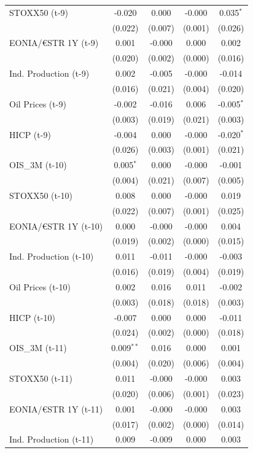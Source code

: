 \begin{longtable}[t]{lcccc}
STOXX50 (t-9) & -0.020 & 0.000 & -0.000 & 0.035$^{*}$\\
 & (0.022) & (0.007) & (0.001) & (0.026)\\
EONIA/€STR 1Y (t-9) & 0.001 & -0.000 & 0.000 & 0.002\\
 & (0.020) & (0.002) & (0.000) & (0.016)\\
Ind. Production (t-9) & 0.002 & -0.005 & -0.000 & -0.014\\
 & (0.016) & (0.021) & (0.004) & (0.020)\\
Oil Prices (t-9) & -0.002 & -0.016 & 0.006 & -0.005$^{*}$\\
 & (0.003) & (0.019) & (0.021) & (0.003)\\
HICP (t-9) & -0.004 & 0.000 & -0.000 & -0.020$^{*}$\\
 & (0.026) & (0.003) & (0.001) & (0.021)\\
OIS\_3M (t-10) & 0.005$^{*}$ & 0.000 & -0.000 & -0.001\\
 & (0.004) & (0.021) & (0.007) & (0.005)\\
STOXX50 (t-10) & 0.008 & 0.000 & -0.000 & 0.019\\
 & (0.022) & (0.007) & (0.001) & (0.025)\\
EONIA/€STR 1Y (t-10) & 0.000 & -0.000 & -0.000 & 0.004\\
 & (0.019) & (0.002) & (0.000) & \vphantom{1} (0.015)\\
Ind. Production (t-10) & 0.011 & -0.011 & -0.000 & -0.003\\
 & (0.016) & (0.019) & (0.004) & (0.019)\\
Oil Prices (t-10) & 0.002 & 0.016 & 0.011 & -0.002\\
 & (0.003) & (0.018) & (0.018) & (0.003)\\
HICP (t-10) & -0.007 & 0.000 & 0.000 & -0.011\\
 & (0.024) & (0.002) & (0.000) & (0.018)\\
OIS\_3M (t-11) & 0.009$^{**}$ & 0.016 & 0.000 & 0.001\\
 & (0.004) & (0.020) & (0.006) & (0.004)\\
STOXX50 (t-11) & 0.011 & -0.000 & -0.000 & 0.003\\
 & (0.020) & (0.006) & (0.001) & (0.023)\\
EONIA/€STR 1Y (t-11) & 0.001 & -0.000 & -0.000 & 0.003\\
 & (0.017) & (0.002) & (0.000) & (0.014)\\
Ind. Production (t-11) & 0.009 & -0.009 & 0.000 & 0.003\\

\end{longtable}

